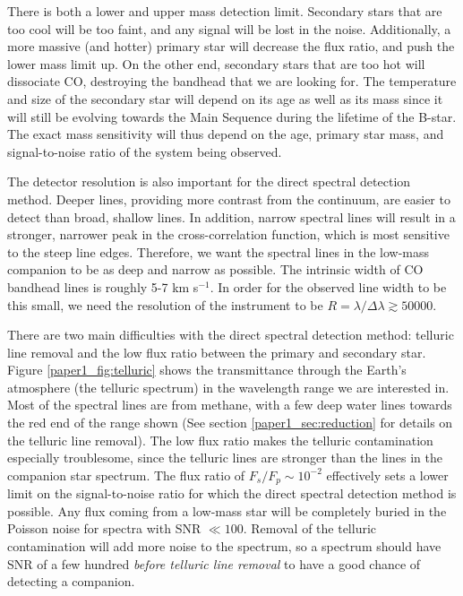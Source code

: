 There is both a lower and upper mass detection
limit. Secondary stars that are too cool will be too faint, and any
signal will be lost in the noise. Additionally, a more massive (and
hotter) primary star will decrease the flux ratio, and push the lower
mass limit up. On the other end, secondary
stars that are too hot will dissociate CO, destroying the bandhead
that we are looking for. The temperature and size of the secondary star will
depend on its age as well as its mass since it will still be
evolving towards the Main Sequence during the lifetime of the
B-star. The exact mass sensitivity will thus depend on the age,
primary star mass, and signal-to-noise ratio of the system being observed. 

The detector resolution is also important for the direct spectral detection
method. Deeper lines, providing more contrast from the
continuum, are easier to detect than broad, shallow lines. In
addition, narrow spectral lines will result in a stronger, narrower peak in the
cross-correlation function, which is most sensitive to the steep line
edges. Therefore, we want the spectral lines in the low-mass companion
to be as deep and narrow as possible. The intrinsic width of CO bandhead lines is
roughly 5-7 km s$^{-1}$. In order for the observed line width to be this
small, we need the resolution of the instrument to be $R =
\lambda/\Delta \lambda \gtrsim 50000$. 



There are two main difficulties with the direct spectral detection method: 
telluric line removal and the low flux ratio between the primary and secondary
star. Figure \ref{paper1_fig:telluric} shows the transmittance through the
Earth's atmosphere (the telluric spectrum) in the wavelength range we
are interested in. Most of the spectral lines are from methane, with a
few deep water lines towards the red end
of the range shown (See section \ref{paper1_sec:reduction} for details on the
telluric line removal). The low flux ratio makes the telluric
contamination especially troublesome, since the telluric lines are
stronger than the lines in the companion star spectrum. The flux ratio of $F_s/F_p
\sim10^{-2}$ effectively sets a lower limit on the signal-to-noise
ratio for which the direct spectral detection method is possible. 
Any flux coming from a low-mass star will be completely buried
in the Poisson noise for spectra with SNR $\ll100$. Removal of the 
telluric contamination will add more noise to the spectrum, so a spectrum
should have SNR of a few hundred \emph{before telluric line removal}
to have a good chance of detecting a companion.




